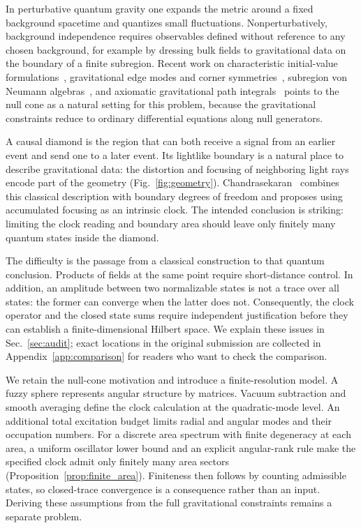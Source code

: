 \documentclass[onecolumn,11pt,aps,prd,amsmath,amssymb,nofootinbib,floatfix]{revtex4-2}
\begin{document}
In perturbative quantum gravity one expands the metric around a fixed background spacetime and quantizes small fluctuations. Nonperturbatively, background independence requires observables defined without reference to any chosen background, for example by dressing bulk fields to gravitational data on the boundary of a finite subregion. Recent work on characteristic initial-value formulations~\cite{ChoquetBruhat2011,Reisenberger2008,Reisenberger2013}, gravitational edge modes and corner symmetries~\cite{DonnellyFreidel2016,FreidelGeillerPranzetti2020,ChandrasekaranFlanagan2023,CiambelliFreidelLeigh2024,CiambelliKlinger2026}, subregion von Neumann algebras~\cite{CLPW2023,CPW2023}, and axiomatic gravitational path integrals~\cite{CDMW2024} points to the null cone as a natural setting for this problem, because the gravitational constraints reduce to ordinary differential equations along null generators.

A causal diamond is the region that can both receive a signal from an earlier event and send one to a later event. Its lightlike boundary is a natural place to describe gravitational data: the distortion and focusing of neighboring light rays encode part of the geometry (Fig.~\ref{fig:geometry}). Chandrasekaran~\cite{Chandrasekaran2026} combines this classical description with boundary degrees of freedom and proposes using accumulated focusing as an intrinsic clock. The intended conclusion is striking: limiting the clock reading and boundary area should leave only finitely many quantum states inside the diamond.

The difficulty is the passage from a classical construction to that quantum conclusion. Products of fields at the same point require short-distance control. In addition, an amplitude between two normalizable states is not a trace over all states: the former can converge when the latter does not. Consequently, the clock operator and the closed state sums require independent justification before they can establish a finite-dimensional Hilbert space. We explain these issues in Sec.~\ref{sec:audit}; exact locations in the original submission are collected in Appendix~\ref{app:comparison} for readers who want to check the comparison.

We retain the null-cone motivation and introduce a finite-resolution model. A fuzzy sphere represents angular structure by matrices. Vacuum subtraction and smooth averaging define the clock calculation at the quadratic-mode level. An additional total excitation budget limits radial and angular modes and their occupation numbers. For a discrete area spectrum with finite degeneracy at each area, a uniform oscillator lower bound and an explicit angular-rank rule make the specified clock admit only finitely many area sectors (Proposition~\ref{prop:finite_area}). Finiteness then follows by counting admissible states, so closed-trace convergence is a consequence rather than an input. Deriving these assumptions from the full gravitational constraints remains a separate problem.
\end{document}
